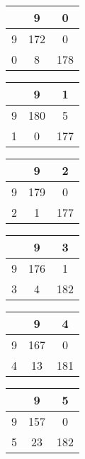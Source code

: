 \documentclass[12pt]{article}
\begin{document}
		\begin{multicols}{3}
			\begin{tabular}{| c | c | c |}
				\hline
				& 9 & 0 \\ 
				\hline
				9 & 172 & 0 \\ 
				\hline
				0 & 8 & 178 \\ 
				\hline
			\end{tabular}
			\newline


			\begin{tabular}{| c | c | c |}
				\hline
				& 9 & 1 \\ 
				\hline
				9 & 180 & 5 \\ 
				\hline
				1 & 0 & 177 \\ 
				\hline
			\end{tabular}
			\newline


			\begin{tabular}{| c | c | c |}
				\hline
				& 9 & 2 \\ 
				\hline
				9 & 179 & 0 \\ 
				\hline
				2 & 1 & 177 \\ 
				\hline
			\end{tabular}
			\newline


			\begin{tabular}{| c | c | c |}
				\hline
				& 9 & 3 \\ 
				\hline
				9 & 176 & 1 \\ 
				\hline
				3 & 4 & 182 \\ 
				\hline
			\end{tabular}
			\newline


			\begin{tabular}{| c | c | c |}
				\hline
				& 9 & 4 \\ 
				\hline
				9 & 167 & 0 \\ 
				\hline
				4 & 13 & 181 \\ 
				\hline
			\end{tabular}
			\newline


			\begin{tabular}{| c | c | c |}
				\hline
				& 9 & 5 \\ 
				\hline
				9 & 157 & 0 \\ 
				\hline
				5 & 23 & 182 \\ 
				\hline
			\end{tabular}
			\newline



\end{multicols}
\end{document}

